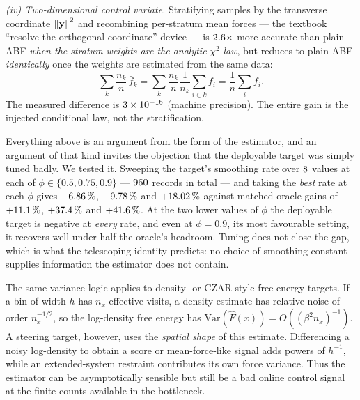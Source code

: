 \emph{(iv) Two-dimensional control variate.} Stratifying samples by the
transverse coordinate $\left\lVert \mathbf y \right\rVert^2$ and recombining per-stratum mean forces
--- the textbook ``resolve the orthogonal coordinate'' device --- is
$2.6\times$ more accurate than plain ABF \emph{when the stratum
weights are the analytic} $\chi^2$ \emph{law}, but reduces to plain ABF
\emph{identically} once the weights are estimated from the same data:
\begin{equation}
  \sum_k \frac{n_k}{n}\,\bar f_k
  = \sum_k \frac{n_k}{n}\frac{1}{n_k}\sum_{i\in k} f_i
  = \frac1n\sum_i f_i.
\end{equation}
The measured difference is $3\times10^{-16}$ (machine precision). The entire
gain is the injected conditional law, not the stratification.

\begin{remark}
\label{rem:edb_ema}
Everything above is an argument from the form of the estimator, and an argument of that kind
invites the objection that the deployable target was simply tuned badly. We tested it. Sweeping
the target's smoothing rate over $8$ values at each of $\phi \in \{0.5, 0.75, 0.9\}$
--- $960$ records in total --- and taking the \emph{best} rate at each $\phi$ gives
$-6.86\,\%$, $-9.78\,\%$ and $+18.02\,\%$ against matched oracle gains of
$+11.1\,\%$, $+37.4\,\%$ and $+41.6\,\%$. At the two lower values of
$\phi$ the deployable target is negative at \emph{every} rate, and even at $\phi = 0.9$, its most
favourable setting, it recovers well under half the oracle's headroom. Tuning does not close the
gap, which is what the telescoping identity predicts: no choice of smoothing constant supplies
information the estimator does not contain.
\end{remark}

The same variance logic applies to density- or CZAR-style free-energy targets. If
a bin of width $h$ has $n_x$ effective visits, a density estimate has relative
noise of order $n_x^{-1/2}$, so the log-density free energy has
$\mathrm{Var}(\widehat F(x))=O((\beta^2 n_x)^{-1})$. A steering target, however,
uses the \emph{spatial shape} of this estimate. Differencing a noisy log-density
to obtain a score or mean-force-like signal adds powers of $h^{-1}$, while an
extended-system restraint contributes its own force variance. Thus the estimator
can be asymptotically sensible but still be a bad online control signal at the
finite counts available in the bottleneck.

